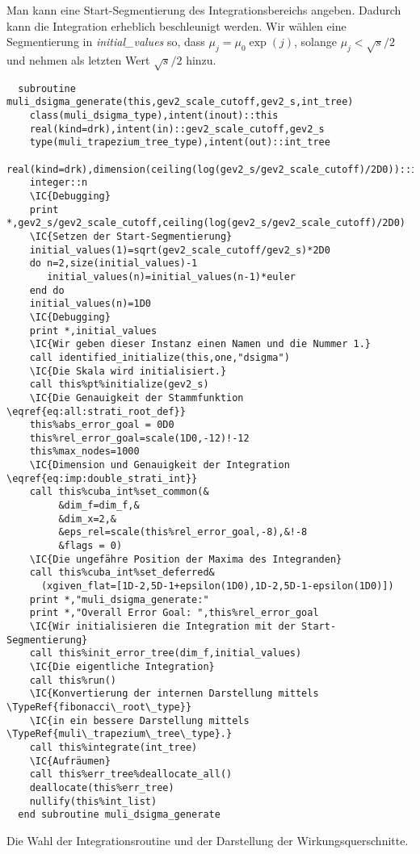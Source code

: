 Man kann eine Start-Segmentierung des Integrationsbereichs angeben. Dadurch kann die Integration erheblich beschleunigt werden. Wir wählen eine Segmentierung in \emph{initial\_values} so, dass $\mu_j=\mu_0\exp(j)$, solange $\mu_j<\sqrt{s}/2$ und nehmen als letzten Wert $\sqrt{s}/2$ hinzu.
\begin{Verbatim}
  subroutine muli_dsigma_generate(this,gev2_scale_cutoff,gev2_s,int_tree)
    class(muli_dsigma_type),intent(inout)::this
    real(kind=drk),intent(in)::gev2_scale_cutoff,gev2_s
    type(muli_trapezium_tree_type),intent(out)::int_tree
    real(kind=drk),dimension(ceiling(log(gev2_s/gev2_scale_cutoff)/2D0))::initial_values
    integer::n
    \IC{Debugging}
    print *,gev2_s/gev2_scale_cutoff,ceiling(log(gev2_s/gev2_scale_cutoff)/2D0)
    \IC{Setzen der Start-Segmentierung}
    initial_values(1)=sqrt(gev2_scale_cutoff/gev2_s)*2D0
    do n=2,size(initial_values)-1
       initial_values(n)=initial_values(n-1)*euler
    end do
    initial_values(n)=1D0
    \IC{Debugging}
    print *,initial_values
    \IC{Wir geben dieser Instanz einen Namen und die Nummer 1.}
    call identified_initialize(this,one,"dsigma")
    \IC{Die Skala wird initialisiert.}
    call this%pt%initialize(gev2_s)
    \IC{Die Genauigkeit der Stammfunktion \eqref{eq:all:strati_root_def}}
    this%abs_error_goal = 0D0
    this%rel_error_goal=scale(1D0,-12)!-12
    this%max_nodes=1000
    \IC{Dimension und Genauigkeit der Integration \eqref{eq:imp:double_strati_int}}
    call this%cuba_int%set_common(&
         &dim_f=dim_f,&
         &dim_x=2,&
         &eps_rel=scale(this%rel_error_goal,-8),&!-8
         &flags = 0)
    \IC{Die ungefähre Position der Maxima des Integranden}
    call this%cuba_int%set_deferred&
      (xgiven_flat=[1D-2,5D-1+epsilon(1D0),1D-2,5D-1-epsilon(1D0)])
    print *,"muli_dsigma_generate:"
    print *,"Overall Error Goal: ",this%rel_error_goal
    \IC{Wir initialisieren die Integration mit der Start-Segmentierung}
    call this%init_error_tree(dim_f,initial_values)
    \IC{Die eigentliche Integration}
    call this%run()
    \IC{Konvertierung der internen Darstellung mittels \TypeRef{fibonacci\_root\_type}}
    \IC{in ein bessere Darstellung mittels \TypeRef{muli\_trapezium\_tree\_type}.}
    call this%integrate(int_tree)
    \IC{Aufräumen}
    call this%err_tree%deallocate_all()
    deallocate(this%err_tree)
    nullify(this%int_list)
  end subroutine muli_dsigma_generate
\end{Verbatim}
Die Wahl der Integrationsroutine und der Darstellung der Wirkungsquerschnitte.
